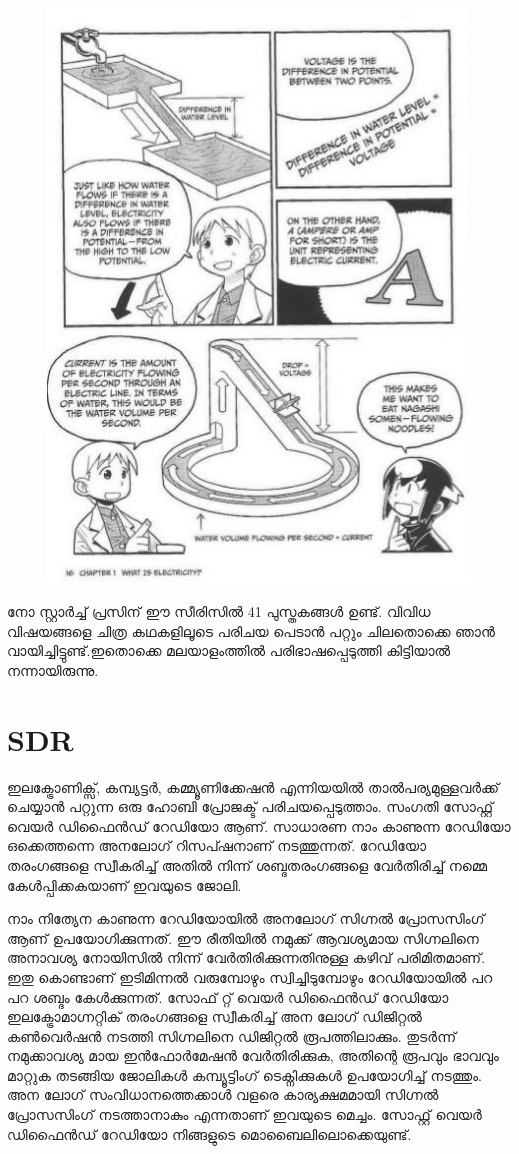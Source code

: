 \documentclass[10pt,a4paper]{report}
\begin{document}
 \begin{figure}[H]
  \center
\includegraphics[scale=.25]{images/manga5}
\label{manga5}
\caption{   }
\end{figure}
    നോ സ്റ്റാര്‍ച്ച് പ്രസിന് ഈ സീരിസില്‍ 41 പുസ്തകങ്ങള്‍ ഉണ്ട്. വിവിധ വിഷയങ്ങളെ ചിത്ര കഥകളിലൂടെ പരിചയ പെടാൻ  പറ്റും  ചിലതൊക്കെ ഞാന്‍ വായിച്ചിട്ടുണ്ട്.ഇതൊക്കെ മലയാളംത്തിൽ   പരിഭാഷപ്പെടുത്തി കിട്ടിയാൽ നന്നായിരുന്നു.   
   
    \section{SDR}
    ഇലക്ട്രോണിക്സ്, കമ്പ്യട്ടർ, കമ്മ്യൂണിക്കേഷൻ എന്നിയയിൽ താൽപര്യമുള്ളവർക്ക് ചെയ്യാൻ പറ്റുന്ന ഒരു ഹോബി പ്രോജക്ട് പരിചയപ്പെടുത്താം. സംഗതി സോഫ്റ്റ് വെയർ ഡിഫൈൻഡ് റേഡിയോ ആണ്. സാധാരണ നാം കാണുന്ന റേഡിയോ ഒക്കെത്തന്നെ അനലോഗ് റിസപ്ഷനാണ് നടത്തുന്നത്. റേഡിയോ തരംഗങ്ങളെ സ്വീകരിച്ച് അതിൽ നിന്ന് ശബ്ദതരംഗങ്ങളെ വേർതിരിച്ച് നമ്മെ കേൾപ്പിക്കകയാണ് ഇവയുടെ ജോലി. 
    
    നാം നിത്യേന കാണുന്ന റേഡിയോയിൽ അനലോഗ് സിഗ്നൽ പ്രോസസിംഗ് ആണ് ഉപയോഗിക്കുന്നത്. ഈ രീതിയിൽ നമുക്ക് ആവശ്യമായ സിഗ്നലിനെ അനാവശ്യ നോയിസിൽ നിന്ന് വേർതിരിക്കുന്നതിനുള്ള കഴിവ് പരിമിതമാണ്‌. ഇതു കൊണ്ടാണ് ഇടിമിന്നൽ വരുമ്പോഴും സ്വിച്ചിടുമ്പോഴും റേഡിയോയിൽ പറ പറ ശബ്ദം കേൾക്കുന്നത്. സോഫ് റ്റ് വെയർ ഡിഫൈൻഡ് റേഡിയോ ഇലക്ട്രോമാഗ്നറ്റിക് തരംഗങ്ങളെ സ്വീകരിച്ച് അന ലോഗ് ഡിജിറ്റൽ കൺവെർഷൻ നടത്തി സിഗ്നലിനെ ഡിജിറ്റൽ രൂപത്തിലാക്കും. തുടർന്ന് നമുക്കാവശ്യ മായ ഇൻഫോർമേഷൻ വേർതിരിക്കുക, അതിന്റെ രൂപവും ഭാവവും മാറ്റുക തടങ്ങിയ ജോലികൾ കമ്പ്യൂട്ടിംഗ് ടെക്നിക്കുകൾ ഉപയോഗിച്ച് നടത്തും. അന ലോഗ് സംവിധാനത്തെക്കാൾ വളരെ കാര്യക്ഷമമായി സിഗ്നൽ പ്രോസസിംഗ് നടത്താനാകും എന്നതാണ് ഇവയുടെ മെച്ചം. സോഫ്റ്റ് വെയർ ഡിഫൈൻഡ് റേഡിയോ നിങ്ങളുടെ മൊബൈലിലൊക്കെയുണ്ട്. 
    
\end{document}
